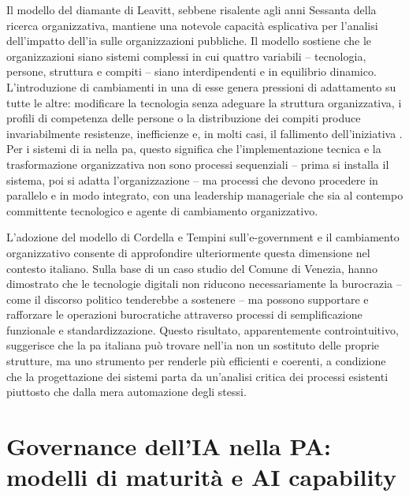 Il modello del diamante di Leavitt, sebbene risalente agli anni Sessanta della ricerca organizzativa, mantiene una notevole capacità esplicativa per l'analisi dell'impatto dell'\gls{ia} sulle organizzazioni pubbliche. Il modello sostiene che le organizzazioni siano sistemi complessi in cui quattro variabili -- tecnologia, persone, struttura e compiti -- siano interdipendenti e in equilibrio dinamico. L'introduzione di cambiamenti in una di esse genera pressioni di adattamento su tutte le altre: modificare la tecnologia senza adeguare la struttura organizzativa, i profili di competenza delle persone o la distribuzione dei compiti produce invariabilmente resistenze, inefficienze e, in molti casi, il fallimento dell'iniziativa \parencite{Nograsek2014}. Per i sistemi di \gls{ia} nella \gls{pa}, questo significa che l'implementazione tecnica e la trasformazione organizzativa non sono processi sequenziali -- prima si installa il sistema, poi si adatta l'organizzazione -- ma processi che devono procedere in parallelo e in modo integrato, con una leadership manageriale che sia al contempo committente tecnologico e agente di cambiamento organizzativo.

L'adozione del modello di Cordella e Tempini sull'e-government e il cambiamento organizzativo consente di approfondire ulteriormente questa dimensione nel contesto italiano. Sulla base di un caso studio del Comune di Venezia, \textcite{Cordella2015} hanno dimostrato che le tecnologie digitali non riducono necessariamente la burocrazia -- come il discorso politico tenderebbe a sostenere -- ma possono supportare e rafforzare le operazioni burocratiche attraverso processi di semplificazione funzionale e standardizzazione. Questo risultato, apparentemente controintuitivo, suggerisce che la \gls{pa} italiana può trovare nell'\gls{ia} non un sostituto delle proprie strutture, ma uno strumento per renderle più efficienti e coerenti, a condizione che la progettazione dei sistemi parta da un'analisi critica dei processi esistenti piuttosto che dalla mera automazione degli stessi.

\section{Governance dell'IA nella PA: modelli di maturità e AI capability}
\label{sec:cap2-governance-ia}

